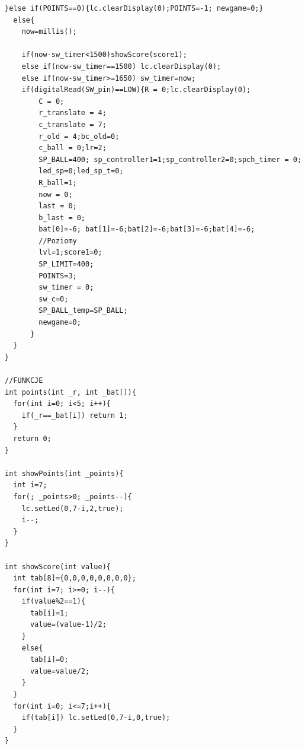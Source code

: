 \documentclass[12pt,notitlepage]{article}
\begin{document}
\begin{lstlisting}[style=CStyle]
  }else if(POINTS==0){lc.clearDisplay(0);POINTS=-1; newgame=0;}
  else{
    now=millis();
    
    if(now-sw_timer<1500)showScore(score1);
    else if(now-sw_timer==1500) lc.clearDisplay(0);
    else if(now-sw_timer>=1650) sw_timer=now;
    if(digitalRead(SW_pin)==LOW){R = 0;lc.clearDisplay(0);
        C = 0;
        r_translate = 4;
        c_translate = 7;
        r_old = 4;bc_old=0;
        c_ball = 0;lr=2;
        SP_BALL=400; sp_controller1=1;sp_controller2=0;spch_timer = 0;
        led_sp=0;led_sp_t=0;
        R_ball=1;
        now = 0;
        last = 0;
        b_last = 0;
        bat[0]=-6; bat[1]=-6;bat[2]=-6;bat[3]=-6;bat[4]=-6;
        //Poziomy
        lvl=1;score1=0;
        SP_LIMIT=400;
        POINTS=3;
        sw_timer = 0;
        sw_c=0;
        SP_BALL_temp=SP_BALL;
        newgame=0;
      }
  }   
}

//FUNKCJE
int points(int _r, int _bat[]){
  for(int i=0; i<5; i++){
    if(_r==_bat[i]) return 1;
  }
  return 0;
}

int showPoints(int _points){
  int i=7;
  for(; _points>0; _points--){
    lc.setLed(0,7-i,2,true);
    i--;
  }
}

int showScore(int value){
  int tab[8]={0,0,0,0,0,0,0,0};
  for(int i=7; i>=0; i--){
    if(value%2==1){
      tab[i]=1;
      value=(value-1)/2;
    }
    else{
      tab[i]=0;
      value=value/2;
    }
  }
  for(int i=0; i<=7;i++){
    if(tab[i]) lc.setLed(0,7-i,0,true);
  }
}
\end{lstlisting}
\end{document}
